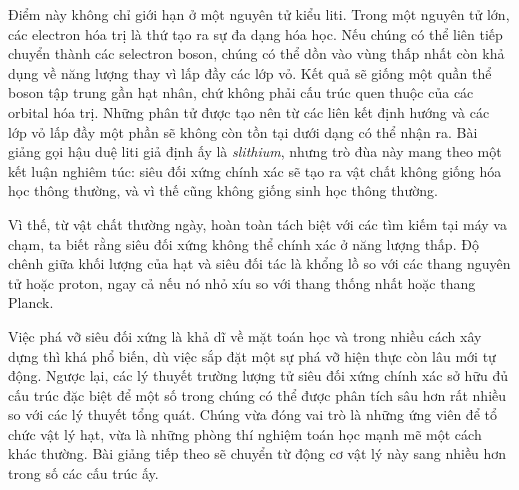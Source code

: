Điểm này không chỉ giới hạn ở một nguyên tử kiểu liti. Trong một nguyên tử lớn, các electron hóa trị là thứ tạo ra sự đa dạng hóa học. Nếu chúng có thể liên tiếp chuyển thành các selectron boson, chúng có thể dồn vào vùng thấp nhất còn khả dụng về năng lượng thay vì lấp đầy các lớp vỏ. Kết quả sẽ giống một quần thể boson tập trung gần hạt nhân, chứ không phải cấu trúc quen thuộc của các orbital hóa trị. Những phân tử được tạo nên từ các liên kết định hướng và các lớp vỏ lấp đầy một phần sẽ không còn tồn tại dưới dạng có thể nhận ra. Bài giảng gọi hậu duệ liti giả định ấy là \emph{slithium}, nhưng trò đùa này mang theo một kết luận nghiêm túc: siêu đối xứng chính xác sẽ tạo ra vật chất không giống hóa học thông thường, và vì thế cũng không giống sinh học thông thường.

\begin{classroomqa}
\end{classroomqa}

Vì thế, từ vật chất thường ngày, hoàn toàn tách biệt với các tìm kiếm tại máy va chạm, ta biết rằng siêu đối xứng không thể chính xác ở năng lượng thấp. Độ chênh giữa khối lượng của hạt và siêu đối tác là khổng lồ so với các thang nguyên tử hoặc proton, ngay cả nếu nó nhỏ xíu so với thang thống nhất hoặc thang Planck.

\begin{classroomqa}
\end{classroomqa}

Việc phá vỡ siêu đối xứng là khả dĩ về mặt toán học và trong nhiều cách xây dựng thì khá phổ biến, dù việc sắp đặt một sự phá vỡ hiện thực còn lâu mới tự động. Ngược lại, các lý thuyết trường lượng tử siêu đối xứng chính xác sở hữu đủ cấu trúc đặc biệt để một số trong chúng có thể được phân tích sâu hơn rất nhiều so với các lý thuyết tổng quát. Chúng vừa đóng vai trò là những ứng viên để tổ chức vật lý hạt, vừa là những phòng thí nghiệm toán học mạnh mẽ một cách khác thường. Bài giảng tiếp theo sẽ chuyển từ động cơ vật lý này sang nhiều hơn trong số các cấu trúc ấy.

